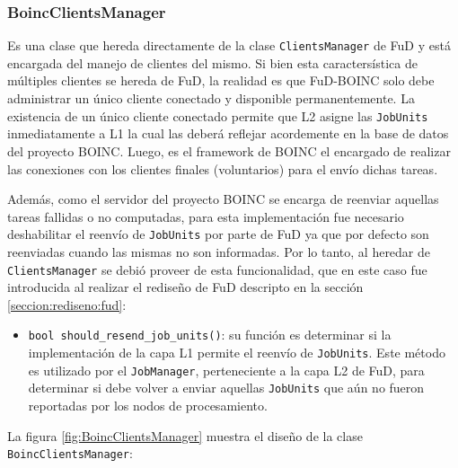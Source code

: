 \subsubsection{BoincClientsManager}
\label{section:BoincClientsManager}
Es una clase que hereda directamente de la clase \texttt{ClientsManager} de FuD y está encargada del manejo de clientes del mismo. Si bien esta caractersística de múltiples clientes se hereda de FuD, la realidad es que FuD-BOINC solo debe administrar un único cliente conectado y disponible permanentemente. La existencia de un único cliente conectado permite que L2 asigne las \texttt{JobUnits} inmediatamente a L1 la cual las deberá reflejar acordemente en la base de datos del proyecto BOINC. Luego, es el framework de BOINC el encargado de realizar las conexiones con los clientes finales (voluntarios) para el envío dichas tareas.

Además, como el servidor del proyecto BOINC se encarga de reenviar aquellas tareas fallidas o no computadas, para esta implementación fue necesario deshabilitar el reenvío de \texttt{JobUnits} por parte de FuD ya que por defecto son reenviadas cuando las mismas no son informadas. 
Por lo tanto, al heredar de \texttt{ClientsManager} se debió proveer de esta funcionalidad, que en este caso fue introducida al realizar el rediseño de FuD descripto en la sección \ref{seccion:rediseno:fud}:

\begin{itemize}
\item \texttt{bool should\_resend\_job\_units()}: su función es determinar si la implementación de la capa L1 permite el reenvío de \texttt{JobUnits}. Este método es utilizado por el \texttt{JobManager}, perteneciente a la capa L2 de FuD, para determinar si debe volver a enviar aquellas \texttt{JobUnits} que aún no fueron reportadas por los nodos de procesamiento.
\end{itemize}

La figura \ref{fig:BoincClientsManager} muestra el diseño de la clase \texttt{BoincClientsManager}:

